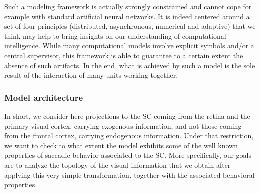 Such a modeling framework is actually strongly constrained and cannot cope for
example with standard artificial neural networks. It is indeed centered around a
set of four principles (distributed, asynchronous, numerical and adaptive) that
we think may help to bring insights on our understanding of computational
intelligence. While many computational models involve explicit symbols and/or
a central supervisor, this framework is able to guarantee to a certain extent
the absence of such artifacts. In the end, what is achieved by such a model is
the sole result of the interaction of many units working together.


\subsubsection{Model architecture}
In short, we consider here projections to the SC coming from the
retina and the primary visual cortex, carrying exogenous information,
and not those coming from the frontal cortex, carrying endogenous
information.  Under that restriction, we want to check to what extent
the model exhibits some of the well known properties of saccadic
behavior associated to the SC. More specifically, our goals are to
analyze the topology of the visual information that we obtain after
applying this very simple transformation, together with the associated
behavioral properties. 

